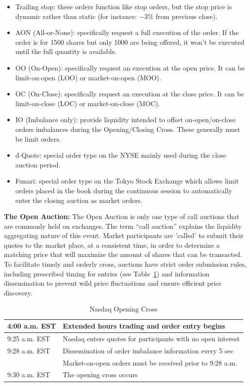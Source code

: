 \begin{itemize}
\item  Trailing stop: these orders function like stop orders, but the stop price is dynamic rather than static (for instance: $-3$\% from previous close).

\item  AON (All-or-None): specifically request a full execution of the order. If the order is for 1500 shares but only 1000 are being offered, it won't be executed until the full quantity is available.

\item  OO (On-Open): specifically request an execution at the open price. It can be limit-on-open (LOO) or market-on-open (MOO).

\item  OC (On-Close): specifically request an execution at the close price. It can be limit-on-close (LOC) or market-on-close (MOC).

\item  IO (Imbalance only): provide liquidity intended to offset on-open/on-close orders imbalances during the Opening/Closing Cross. These generally must be limit orders.

\item  d-Quote: special order type on the NYSE mainly used during the close auction period.

\item  Funari: special order type on the Tokyo Stock Exchange which allows limit orders placed in the book during the continuous session to automatically enter the closing auction as market orders. \\
\end{itemize} 


\noindent\textbf{The Open Auction:} The Open Auction is only one type of call auctions that are commonly held on exchanges. The term ``call auction'' explains the liquidity aggregating nature of this event. Market participants are 'called' to submit their quotes to the market place, at a consistent time, in order to determine a matching price that will maximize the amount of shares that can be transacted. To facilitate timely and orderly cross, auctions have strict order submission rules, including prescribed timing for entries (see Table~\ref{tab:NASDAQopen}) and information dissemination to prevent wild price fluctuations and ensure efficient price discovery.

\begin{table}[!ht]
   \centering
   \caption{Nasdaq Opening Cross \label{tab:NASDAQopen}}
   \begin{tabular}{ll} 
	4:00 a.m. EST & Extended hours trading and order entry begins  \\ \hline
	9:25 a.m. EST & Nasdaq enters quotes for participants with no open interest \\ \hline
	9:28 a.m. EST & Dissemination of order imbalance information every 5 sec  \\ 
	 & Market-on-open orders must be received prior to 9:28 a.m.   \\ \hline	
	9:30 a.m. EST & The opening cross occurs		
   \end{tabular}
\end{table}	


